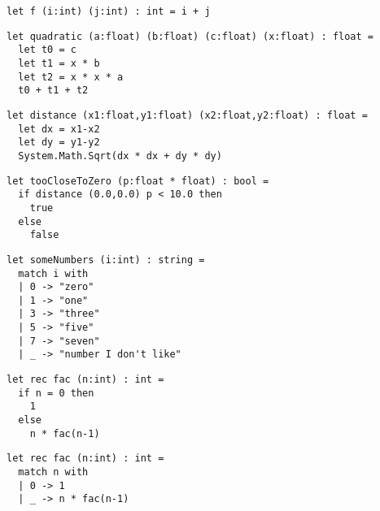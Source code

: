 \documentclass{beamer}
\begin{document}
\begin{frame}[fragile]
\begin{lstlisting}
let f (i:int) (j:int) : int = i + j
\end{lstlisting}
\end{frame}


\begin{frame}[fragile]
\begin{lstlisting}
let quadratic (a:float) (b:float) (c:float) (x:float) : float =
  let t0 = c
  let t1 = x * b
  let t2 = x * x * a
  t0 + t1 + t2
\end{lstlisting}
\end{frame}


\begin{frame}[fragile]
\begin{lstlisting}
let distance (x1:float,y1:float) (x2:float,y2:float) : float = 
  let dx = x1-x2
  let dy = y1-y2
  System.Math.Sqrt(dx * dx + dy * dy)
\end{lstlisting}
\end{frame}


\begin{frame}[fragile]
\begin{lstlisting}
let tooCloseToZero (p:float * float) : bool =
  if distance (0.0,0.0) p < 10.0 then
    true
  else
    false
\end{lstlisting}
\end{frame}

\begin{frame}[fragile]
\begin{lstlisting}
let someNumbers (i:int) : string =
  match i with
  | 0 -> "zero"
  | 1 -> "one"
  | 3 -> "three"
  | 5 -> "five"
  | 7 -> "seven"
  | _ -> "number I don't like"
\end{lstlisting}
\end{frame}

\begin{frame}[fragile]
\begin{lstlisting}
let rec fac (n:int) : int = 
  if n = 0 then 
    1
  else
    n * fac(n-1)
\end{lstlisting}
\end{frame}

\begin{frame}[fragile]
\begin{lstlisting}
let rec fac (n:int) : int = 
  match n with
  | 0 -> 1
  | _ -> n * fac(n-1)
\end{lstlisting}
\end{frame}
\end{document}
